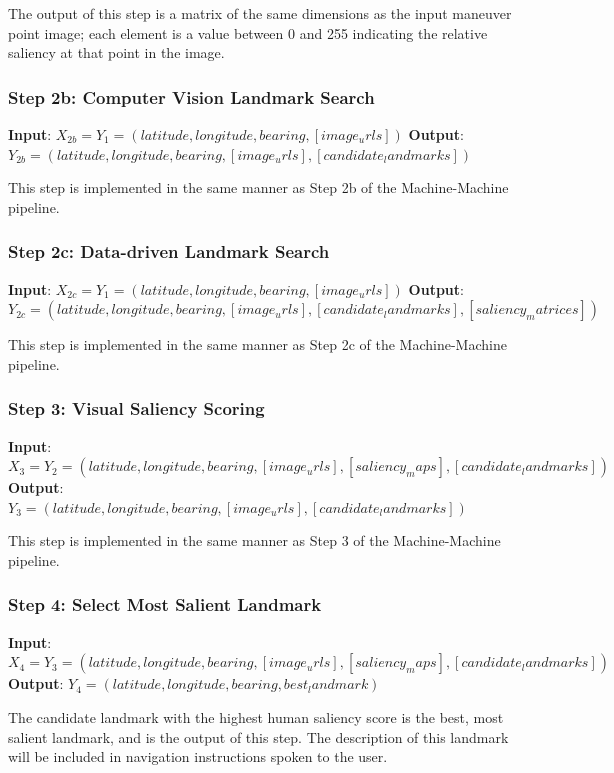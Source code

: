The output of this step is a matrix of the same dimensions as the input maneuver point image; each element is a value between 0 and 255 indicating the relative saliency at that point in the image.

\subsubsection*{Step 2b: Computer Vision Landmark Search}
\textbf{Input}: $X_{2b} = Y_1 = (latitude, longitude, bearing, [image_urls])$
\textbf{Output}: $Y_{2b} = (latitude, longitude, bearing,  [image_urls], [candidate_landmarks] )$ 

This step is implemented in the same manner as Step 2b of the Machine-Machine pipeline.

\subsubsection*{Step 2c: Data-driven Landmark Search}
\textbf{Input}: $X_{2c} = Y_1 = (latitude, longitude, bearing, [image_urls])$
\textbf{Output}: $Y_{2c} = (latitude, longitude, bearing,  [image_urls], [candidate_landmarks], [saliency_matrices] )$ 

This step is implemented in the same manner as Step 2c of the Machine-Machine pipeline.

\subsubsection*{Step 3: Visual Saliency Scoring}

\textbf{Input}: $X_3 = Y_2 = (latitude, longitude, bearing,  [image_urls], [saliency_maps], [candidate_landmarks] )$
\textbf{Output}: $Y_3 = (latitude, longitude, bearing,  [image_urls], [candidate_landmarks] )$ 

This step is implemented in the same manner as Step 3 of the Machine-Machine pipeline.

\subsubsection*{Step 4: Select Most Salient Landmark}

\textbf{Input}: $X_4 = Y_3 = (latitude, longitude, bearing,  [image_urls], [saliency_maps], [candidate_landmarks] )$
\textbf{Output}: $Y_4 = (latitude, longitude, bearing, best_landmark)$
 
The candidate landmark with the highest human saliency score is the best, most salient landmark, and is the output of this step. The description of this landmark will be included in navigation instructions spoken to the user.


